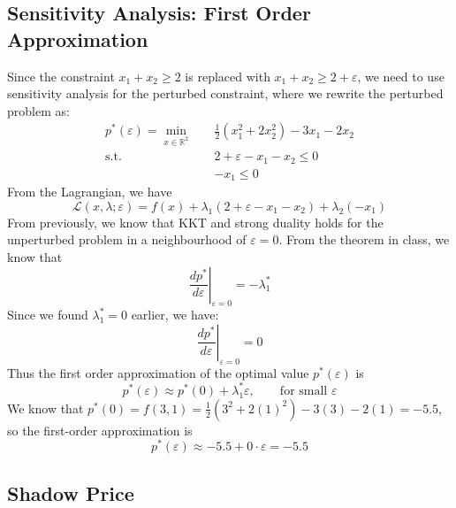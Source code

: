 \documentclass[12pt]{article}
\begin{document}
\subsection*{Sensitivity Analysis: First Order Approximation}

Since the constraint $x_{1} + x_{2} \geq 2$ is replaced with $x_{1} + x_{2} \geq 2 + \varepsilon$, we need to use sensitivity analysis for the perturbed constraint, where we rewrite the perturbed problem as: \begin{align*}
    p^{*}(\varepsilon) = \min_{x \in \mathbb{R}^{2}} \quad & \frac{1}{2} (x_{1}^2 + 2x_{2}^2)- 3 x_{1} -2 x_{2} \\
    \text{s.t. } \; & 2 + \varepsilon - x_{1} - x_{2} \leq 0 \\ 
    & - x_{1} \leq 0
\end{align*} From the Lagrangian, we have \begin{equation*}
    \mathcal{L} (x, \lambda; \varepsilon) = f(x) + \lambda_1 (2 + \varepsilon - x_{1} - x_{2}) + \lambda_2 (-x_{1})
\end{equation*} From previously, we know that KKT and strong duality holds for the unperturbed problem in a neighbourhood of $\varepsilon = 0$. From the theorem in class, we know that \begin{equation}
    \left. \frac{d p^*}{d \varepsilon} \right \vert_{\varepsilon=0} = -\lambda^*_1
\end{equation} Since we found $\lambda^{*}_1 = 0$ earlier, we have: \begin{equation}
    \left. \frac{d p^*}{d \varepsilon} \right \vert_{\varepsilon=0} = 0
\end{equation} Thus the first order approximation of the optimal value $p^*(\varepsilon)$ is \begin{equation}
    p^{*}(\varepsilon) \approx p^{*} (0) + \lambda_1^{*} \varepsilon, \qquad \text{for small } \varepsilon
\end{equation} We know that $p^{*}(0) = f(3,1) = \frac{1}{2}(3^2 + 2(1)^2) - 3(3) - 2(1) = -5.5$, so the first-order approximation is \begin{equation*}
    p^{*}(\varepsilon) \approx -5.5 + 0 \cdot \varepsilon = -5.5 
\end{equation*}

\subsection*{Shadow Price}
\end{document}
